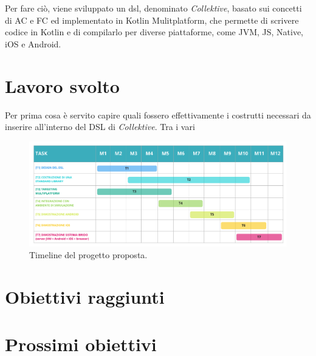\documentclass[13pt, a4paper]{article}
\newcommand{\ck}{\emph{Collektive}}
\begin{document}
Per fare ciò, viene sviluppato un \ac{dsl}, denominato \ck{}, basato sui concetti di \ac{AC} e \ac{FC} ed implementato in Kotlin Mulitplatform,
che permette di scrivere codice in Kotlin e di compilarlo per diverse piattaforme, come JVM, JS, Native, iOS e Android.

\section{Lavoro svolto}\label{sec:lavoro-svolto}

Per prima cosa è servito capire quali fossero effettivamente i costrutti necessari da inserire all'interno del DSL di \ck{}.
%
Tra i vari


\label{sec:contribution}
\begin{figure}
    \centering
    \includegraphics[width=\textwidth]{images/collektive_timeline}
    \caption{Timeline del progetto proposta.}
    \label{fig:timeline}
\end{figure}

\section{Obiettivi raggiunti}\label{sec:obiettivi-raggiunti}

\section{Prossimi obiettivi}\label{sec:prossimi-obiettivi}






\cite[none]{none}


\end{document}
